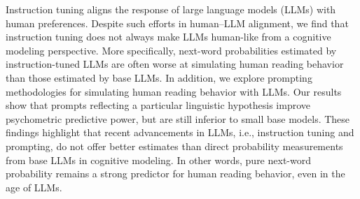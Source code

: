 Instruction tuning aligns the response of large language models (LLMs) with human preferences. Despite such efforts in human--LLM alignment, we find that instruction tuning does not always make LLMs human-like from a cognitive modeling perspective. More specifically, next-word probabilities estimated by instruction-tuned LLMs are often worse at simulating human reading behavior than those estimated by base LLMs. In addition, we explore prompting methodologies for simulating human reading behavior with LLMs.  Our results show that prompts reflecting a particular linguistic hypothesis improve psychometric predictive power, but are still inferior to small base models. These findings highlight that recent advancements in LLMs, i.e., instruction tuning and prompting, do not offer better estimates than direct probability measurements from base LLMs in cognitive modeling. In other words, pure next-word probability remains a strong predictor for human reading behavior, even in the age of LLMs.